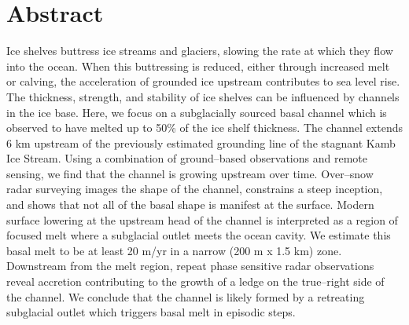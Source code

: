 \label{ch:data}




\section{Abstract}
Ice shelves buttress ice streams and glaciers, slowing the rate at which they flow into the ocean. When this buttressing is reduced, either through increased melt or calving, the acceleration of grounded ice upstream contributes to sea level rise. The thickness, strength, and stability of ice shelves can be influenced by channels in the ice base.
Here, we focus on a subglacially sourced basal channel which is observed to have melted up to 50\% of the ice shelf thickness. The channel extends 6 km upstream of the previously estimated grounding line of the stagnant Kamb Ice Stream. Using a combination of ground--based observations and remote sensing, we find that the channel is growing upstream over time.  Over--snow radar surveying images the shape of the channel, constrains a steep inception, and shows that not all of the basal shape is manifest at the surface.  Modern surface lowering at the upstream head of the channel is interpreted as a region of focused melt where a subglacial outlet meets the ocean cavity. We estimate this basal melt to be at least 20 m/yr in a narrow (200 m x 1.5 km) zone. Downstream from the melt region, repeat phase sensitive radar observations reveal accretion contributing to the growth of a ledge on the true--right side of the channel. 
We conclude that the channel is likely formed by a retreating subglacial outlet which triggers basal melt in episodic steps.




